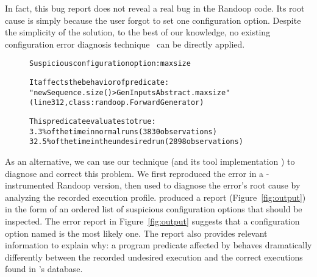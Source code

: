 
In fact, this bug report does not reveal a real bug
in the Randoop code. Its root cause is simply because
the user forgot to set one configuration option.
Despite the simplicity of the solution, to the best of our knowledge, no
existing configuration error diagnosis technique~\cite{Attariyan:2008:UCD, 
Whitaker:2004:CDS, Wang:2004:AMT,
Attariyan:2010:ACT, Rabkin:2011:PPC, autoflow, failuredoc} can be directly applied.




\begin{figure}[t]
\begin{CodeOut}
\begin{alltt} 
Suspicious configuration option: maxsize

It affects the behavior of predicate:
"newSequence.size() > GenInputsAbstract.maxsize"
(line 312, class: randoop.ForwardGenerator) 

This predicate evaluates to true:
  3.3\% of the time in normal runs (3830 observations)
  32.5\% of the time in the undesired run (2898 observations)
\end{alltt}
\end{CodeOut}
\vspace*{-13pt}
\end{figure}

As an alternative, we can use our technique (and its tool implementation \ourtool)
to diagnose and correct this problem. We first reproduced the
error in a \ourtool-instrumented Randoop version, then used \ourtool
to diagnose the error's root cause by analyzing the recorded execution profile.
\ourtool produced
a report (Figure~\ref{fig:output}) in the form of an ordered list of
suspicious configuration options that should be inspected.
The error report in Figure~\ref{fig:output} suggests that
a configuration option named
 is the most likely one.
The report also provides relevant 
information to explain why: %
a program predicate affected by  behaves dramatically
differently between the recorded undesired execution
and the correct executions found in \ourtool's database.

